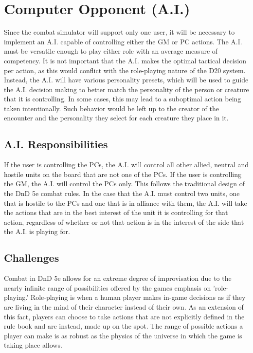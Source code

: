 \documentclass[12pt,a4paper]{report}
\begin{document}
	\section{Computer Opponent (A.I.)}
	Since the combat simulator will support only one user, it will be necessary to implement an A.I. capable of controlling either the GM or PC actions. The A.I. must be versatile enough to play either role with an average measure of competency. It is not important that the A.I. makes the optimal tactical decision per action, as this would conflict with the role-playing nature of the D20 system. Instead, the A.I. will have various personality presets, which will be used to guide the A.I. decision making to better match the personality of the person or creature that it is controlling. In some cases, this may lead to a suboptimal action being taken intentionally. Such behavior would be left up to the creator of the encounter and the personality they select for each creature they place in it.
	
		\subsection{A.I. Responsibilities}
		If the user is controlling the PCs, the A.I. will control all other allied, neutral and hostile units on the board that are not one of the PCs. If the user is controlling the GM, the A.I. will control the PCs only. This follows the traditional design of the DnD 5e combat rules. In the case that the A.I. must control two units, one that is hostile to the PCs and one that is in alliance with them, the A.I. will take the actions that are in the best interest of the unit it is controlling for that action, regardless of whether or not that action is in the interest of the side that the A.I. is playing for. 
		
		\subsection{Challenges}
		Combat in DnD 5e allows for an extreme degree of improvisation due to the nearly infinite range of possibilities offered by the games emphasis on 'role-playing.' Role-playing is when a human player makes in-game decisions as if they are living in the mind of their character instead of their own. As an extension of this fact, players can choose to take actions that are not explicitly defined in the rule book and are instead, made up on the spot. The range of possible actions a player can make is as robust as the physics of the universe in which the game is taking place allows. 
		
\end{document}
